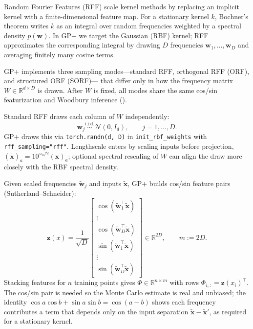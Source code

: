 \documentclass[11pt]{article}
\newcommand{\Ph}{\Phi}
\begin{document}
Random Fourier Features (RFF) \citep{rahimi2007rff} scale kernel methods by replacing an implicit
kernel with a finite-dimensional feature map.
For a stationary kernel $k$, Bochner's theorem writes $k$ as an integral over random frequencies
weighted by a spectral density $p(\mathbf w)$.
In GP+ we target the Gaussian (RBF) kernel; RFF approximates the corresponding integral by drawing
$D$ frequencies $\mathbf w_1,\ldots,\mathbf w_D$ and averaging finitely many cosine terms.

GP+ implements three sampling modes---standard RFF, orthogonal RFF (ORF), and structured ORF (SORF)---
that differ only in how the frequency matrix $W \in \mathbb{R}^{d \times D}$ is drawn.
After $W$ is fixed, all modes share the same cos/sin featurization and Woodbury inference
().

Standard RFF draws each column of $W$ independently:
\begin{equation}
  \label{eq:rff-iid}
  \mathbf w_j \stackrel{\text{i.i.d.}}{\sim} \mathcal{N}(0, I_d),
  \qquad j = 1,\ldots,D.
\end{equation}
GP+ draws this via \texttt{torch.randn(d, D)} in \texttt{init\_rbf\_weights} with
\texttt{rff\_sampling="rff"}.
Lengthscale enters by scaling inputs before projection,
$(\tilde{\mathbf x})_a = 10^{\omega_a/2}(\mathbf x)_a$; optional spectral rescaling of $W$ can align
the draw more closely with the RBF spectral density.

Given scaled frequencies $\tilde{\mathbf w}_j$ and inputs $\tilde{\mathbf x}$, GP+ builds cos/sin
feature pairs (Sutherland--Schneider):
\begin{equation}
  \label{eq:featurize}
  \mathbf z(x)
  = \frac{1}{\sqrt{D}}
  \begin{bmatrix}
    \cos(\tilde{\mathbf w}_1^{\top}\tilde{\mathbf x}) \\
    \vdots \\
    \cos(\tilde{\mathbf w}_D^{\top}\tilde{\mathbf x}) \\
    \sin(\tilde{\mathbf w}_1^{\top}\tilde{\mathbf x}) \\
    \vdots \\
    \sin(\tilde{\mathbf w}_D^{\top}\tilde{\mathbf x})
  \end{bmatrix}
  \in \mathbb{R}^{2D},
  \qquad m := 2D.
\end{equation}
Stacking features for $n$ training points gives $\Ph \in \mathbb{R}^{n \times m}$ with rows
$\Ph_{i,:} = \mathbf z(x_i)^\top$.
The cos/sin pair is needed so the Monte Carlo estimate is real and unbiased; the identity
$\cos a \cos b + \sin a \sin b = \cos(a-b)$ shows each frequency contributes a term that depends only
on the input separation $\tilde{\mathbf x} - \tilde{\mathbf x}'$, as required for a stationary kernel.
\end{document}
